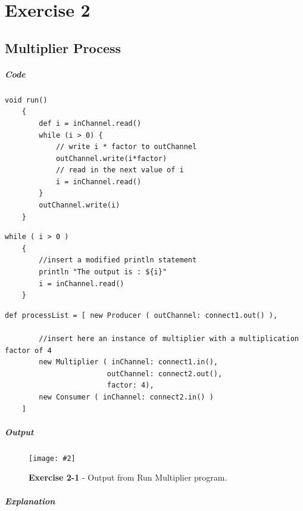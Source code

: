 \documentclass[10pt, a4paper]{article}
\title{\mytitle}
\author{\myauthor\hspace{1em}\\\contact\\Edinburgh Napier University\hspace{0.5em}-\hspace{0.5em}\mymodule}
\date{}
\newcommand{\figuremacro}[5]{
    \begin{figure}[#1]
        \centering
        \texttt{[image: \#2]}
        \caption[#3]{\textbf{#3}#4}
        \label{fig:#2}
    \end{figure}
}
\begin{document}
	\maketitle	
	
	\setcounter{section}{2}
	\section*{Exercise 2}

	\subsection{Multiplier Process}
	
	\subparagraph{Code}
	
	\hfill	
	
	\begin{lstlisting}[caption = "Multiplier.groovy" \label{lst:multi}]
	void run()
	{
		def i = inChannel.read()
		while (i > 0) {
			// write i * factor to outChannel
			outChannel.write(i*factor)
			// read in the next value of i
			i = inChannel.read()
		}
		outChannel.write(i)
	}		\end{lstlisting}
	
	\begin{lstlisting}[caption = "Consumer.groovy"
	\label{lst:consumer}]
	while ( i > 0 )
	{
	    //insert a modified println statement
	    println "The output is : ${i}"
	    i = inChannel.read()
	}	\end{lstlisting}
	
	\begin{lstlisting}[caption = "RunMultiplier.groovy" \label{lst:runMulti}]
	def processList = [ new Producer ( outChannel: connect1.out() ),
	
		//insert here an instance of multiplier with a multiplication factor of 4
		new Multiplier ( inChannel: connect1.in(),
						outChannel: connect2.out(),
						factor: 4),
		new Consumer ( inChannel: connect2.in() )
	]	\end{lstlisting}
	
	\subparagraph{Output} \hfill
	
	\figuremacro{H}{2-1}{Exercise 2-1}{ - Output from Run Multiplier program.}{0.4}

	\subparagraph{Explanation}
	
\end{document}
